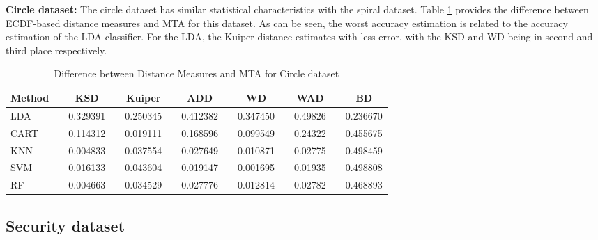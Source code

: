 \documentclass{article}
\begin{document}
\textbf{Circle dataset:} The circle dataset has similar statistical characteristics with the spiral dataset. Table \ref{TB_Circle} provides the difference between ECDF-based distance measures and MTA for this dataset. As can be seen, the worst accuracy estimation is related to the accuracy estimation of the LDA classifier. For the LDA, the Kuiper distance estimates with less error, with the KSD and WD being in second and third place respectively.
\begin{table}[htbp]
  \centering
  \caption{Difference between Distance Measures and MTA for Circle dataset}
    \begin{tabular}{lrcrcrccccccc}
    \hline \hline
    Method   &          & KSD      &          & Kuiper  &          & ADD      &          & WD       &          & WAD      &          & BD \\
    \hline 
    LDA      &          & 0.329391 &          & 0.250345 &          & 0.412382 &          & 0.347450  &          & 0.49826 &          & 0.236670 \\
    CART     &          & 0.114312 &          & 0.019111 &          & 0.168596 &          & 0.099549 &          & 0.24322 &          & 0.455675 \\
    KNN      &          & 0.004833 &          & 0.037554 &          & 0.027649 &          & 0.010871 &          & 0.02775  &          & 0.498459 \\
    SVM      &          & 0.016133 &          & 0.043604 &          & 0.019147 &          & 0.001695 &          & 0.01935  &          & 0.498808 \\
    RF       &          & 0.004663 &          & 0.034529 &          & 0.027776 &          & 0.012814 &          & 0.02782  &          & 0.468893 \\
    \hline \hline
    \end{tabular}\label{TB_Circle}\end{table}

\subsection{Security dataset} \label{case-study-security}
\end{document}
